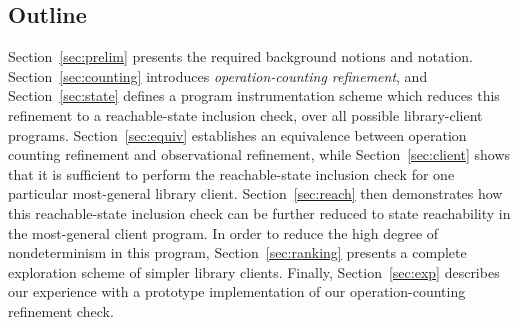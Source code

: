 \subsection{Outline}
\label{sec:outline}

Section~\ref{sec:prelim} presents the required background notions and notation.
Section~\ref{sec:counting} introduces \emph{operation-counting refinement}, and
Section~\ref{sec:state} defines a program instrumentation scheme which reduces this refinement to a
reachable-state inclusion check, over all possible library-client programs.
Section~\ref{sec:equiv} establishes an equivalence between operation counting
refinement and observational refinement, while Section~\ref{sec:client} shows
that it is sufficient to perform the reachable-state inclusion check for one
particular most-general library client. Section~\ref{sec:reach} then
demonstrates how this reachable-state inclusion check can be further reduced to
state reachability in the most-general client program. In order to reduce
the high degree of nondeterminism in this program, Section~\ref{sec:ranking} presents
a complete exploration scheme of simpler library clients.
Finally,
Section~\ref{sec:exp} describes our experience with a prototype implementation
of our operation-counting refinement check.

